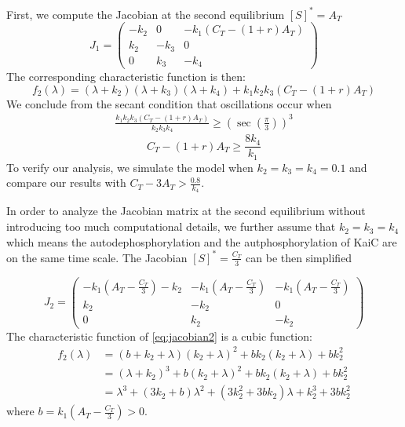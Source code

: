 \documentclass[a4paper,10pt]{article}
\numberwithin{equation}{section}
\begin{document}
First, we compute the Jacobian at the second equilibrium $[S]^*=A_T$
\begin{equation}\label{eq:jacobian1}
J_1=
\begin{pmatrix}
-k_2 & 0 & -k_1(C_T-(1+r)A_T)\\
k_2 & -k_3 & 0\\
0 & k_3 & -k_4 
\end{pmatrix}
\end{equation}
The corresponding characteristic function is then:
\[f_2(\lambda)=(\lambda+k_2)(\lambda+k_3)(\lambda+k_4)+k_1k_2k_3(C_T-(1+r)A_T)\]
We conclude from the secant condition that oscillations occur when 
\begin{gather*}
\frac{k_1k_2k_3(C_T-(1+r)A_T)}{k_2k_3k_4}\geq (\sec (\frac{\pi}{3}))^3
\end{gather*}
\begin{equation}\label{eq:ctatcondition}
C_T-(1+r)A_T\geq \frac{8k_4}{k_1}
\end{equation}
To verify our analysis, we simulate the model when $k_2=k_3=k_4=0.1$ and compare our results with $C_T-3A_T>\frac{0.8}{k_4}$. 

In order to analyze the Jacobian matrix at the second equilibrium without introducing too much computational details, we further assume that $k_2=k_3=k_4$ which means the autodephosphorylation and the autphosphorylation of KaiC are on the same time scale.
The Jacobian  $[S]^*=\frac{C_T}{3}$  can be then simplified

\begin{equation}\label{eq:jacobian2}
J_2=
\begin{pmatrix}
-k_1(A_T-\frac{C_T}{3})-k_2 & -k_1(A_T-\frac{C_T}{3}) & -k_1(A_T-\frac{C_T}{3})\\
k_2 & -k_2 & 0\\
0 & k_2 & -k_2 
\end{pmatrix}
\end{equation}
The characteristic function of \ref{eq:jacobian2} is a cubic function:
\begin{equation}
\begin{split}
f_2(\lambda)&=(b+k_2+\lambda)(k_2+\lambda)^2+bk_2(k_2+\lambda)+bk_2^2\\
&=(\lambda+k_2)^3+b(k_2+\lambda)^2+bk_2(k_2+\lambda)+bk_2^2\\
&=\lambda^3+(3k_2+b)\lambda^2+(3k_2^2+3bk_2)\lambda+k_2^3+3bk_2^2
\end{split}
\end{equation}
where $b=k_1(A_T-\frac{C_T}{3})>0$.
\end{document}
